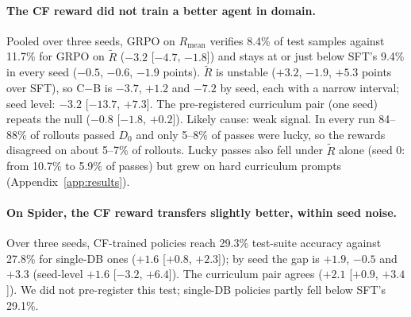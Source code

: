 \documentclass{article}
\begin{document}
\begin{table}[t]
  \caption{\textbf{A harder-to-hack reward trained no better agent in domain, slightly better on Spider.} Values in \%. Verified: correct on all 5 test databases (Wilson 95\% CI, $n=331\times8$); lucky: single-DB minus verified; lucky share: EX passes failing a suite DB. $\uparrow$/$\downarrow$: higher/lower is better; bold: better of pair; GRPO: seed 0 (others: Appendix~\ref{app:seeds}).}
  \label{tab:train}
  \centering
  \small\setlength{\tabcolsep}{3.5pt}
  
\end{table}

\paragraph{The CF reward did not train a better agent in domain.}
Pooled over three seeds, GRPO on $R_{\text{mean}}$ verifies 8.4\% of test samples against 11.7\% for GRPO on $\tilde R$ ($-3.2$ [$-4.7$, $-1.8$]) and stays at or just below SFT's 9.4\% in every seed ($-0.5$, $-0.6$, $-1.9$ points). $\tilde R$ is unstable ($+3.2$, $-1.9$, $+5.3$ points over SFT), so C$-$B is $-3.7$, $+1.2$ and $-7.2$ by seed, each with a narrow interval; seed level: $-3.2$ [$-13.7$, $+7.3$]. The pre-registered curriculum pair (one seed) repeats the null ($-0.8$ [$-1.8$, $+0.2$]). Likely cause: weak signal. In every run 84--88\% of rollouts passed $D_0$ and only 5--8\% of passes were lucky, so the rewards disagreed on about 5--7\% of rollouts. Lucky passes also fell under $\tilde R$ alone (seed 0: from 10.7\% to 5.9\% of passes) but grew on hard curriculum prompts (Appendix~\ref{app:results}).

\paragraph{On Spider, the CF reward transfers slightly better, within seed noise.}
Over three seeds, CF-trained policies reach 29.3\% test-suite accuracy against 27.8\% for single-DB ones ($+1.6$ [$+0.8$, $+2.3$]); by seed the gap is $+1.9$, $-0.5$ and $+3.3$ (seed-level $+1.6$ [$-3.2$, $+6.4$]). The curriculum pair agrees ($+2.1$ [$+0.9$, $+3.4$]). We did not pre-register this test; single-DB policies partly fell below SFT's 29.1\%.

\end{document}
